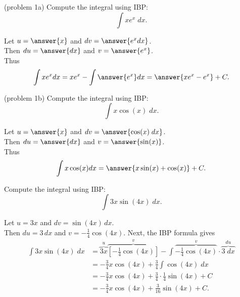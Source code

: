 \documentclass{ximera}
\begin{document}
\begin{problem}(problem 1a) %
  Compute the integral using IBP:
  \[
  \int xe^x \;dx.
  \]
  
  Let $u = \answer{x}$   and   $dv = \answer{e^x dx}$.\\
  Then $du = \answer{dx}$   and   $v = \answer{e^x}$.\\
  Thus 
  \[
  \int xe^x dx = xe^x - \int \answer{e^x} dx = \answer{xe^x - e^x} + C.
  \]
  


    

\end{problem}


\begin{problem}(problem 1b)
  Compute the integral using IBP:
  \[
  \int x\cos(x) \;dx.
  \]
  
  Let $u = \answer{x}$   and   $dv = \answer{\cos(x) \;dx}$.\\
  Then $du = \answer{dx}$   and   $v = \answer{\sin(x)}$.\\
  Thus 
  \[
  \int x\cos(x) dx = \answer{x\sin(x) + \cos(x)} + C.
  \]
  
  


    

\end{problem}


\begin{example}[example 2]
Compute the integral using IBP:
  \[
  \int 3x\sin(4x) \;dx.
  \]

Let $u = 3x$ and $dv = \sin(4x) \,dx$.\\
Then $du = 3 \,dx$ and $v = -\frac14 \cos(4x)$.
Next, the IBP formula gives
\begin{align*}
  \int 3x\sin(4x) \;dx &= \overbrace{3x}^{u}\overbrace{\left[-\frac14 \cos(4x)\right]}^{v} - \int \overbrace{-\frac14 \cos(4x)}^{v}  \cdot \overbrace{3 \; dx}^{du} \\
                       &= -\frac34 x\cos(4x) + \frac34 \int \cos(4x) \; dx \\
                       &= -\frac34 x\cos(4x) + \frac34 \cdot \frac 14 \sin(4x) + C\\
                       &= -\frac34 x\cos(4x) + \frac{3}{16}\sin(4x) + C.
\end{align*}

\end{example}
\end{document}
